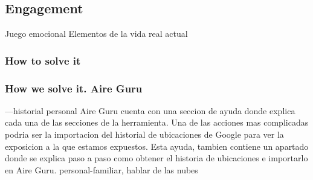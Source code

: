 \subsection{Engagement}
 
Juego emocional
Elementos de la vida real
actual

\subsubsection{How to solve it} 


\subsubsection{How we solve it. Aire Guru} 
---historial personal
Aire Guru cuenta con una seccion de ayuda  donde explica cada una de las secciones de la herramienta. Una de las acciones mas complicadas
podria ser la importacion del historial de ubicaciones de Google para ver la exposicion a la que estamos expuestos. Esta ayuda, tambien 
contiene un apartado donde se explica paso a paso como obtener el historia de ubicaciones e importarlo en Aire Guru.
personal-familiar, hablar de las nubes
\begin{itemize}
    \done
    \crossed
    
\end{itemize}
\newpage